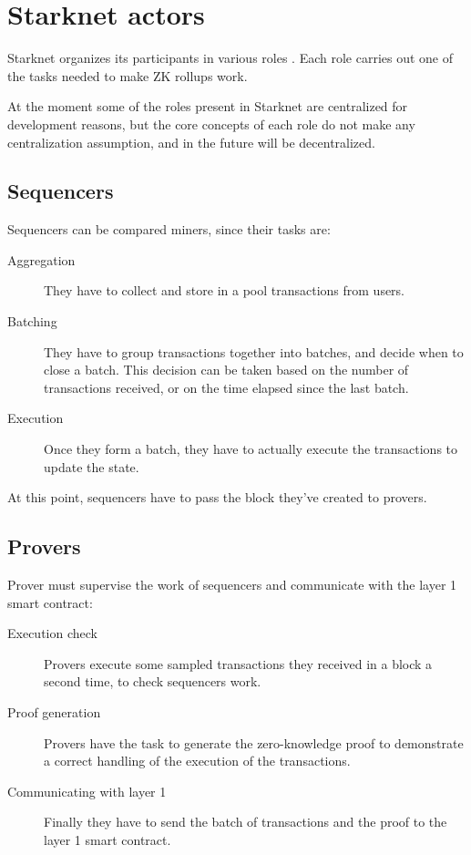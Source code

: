 \documentclass[11pt]{article}
\begin{document}
\section{Starknet actors} \label{section:starknet_actors}
Starknet organizes its participants in various roles \cite{starknet_actors}. Each role carries out one of the tasks needed to make ZK rollups work.

At the moment some of the roles present in Starknet are centralized for development reasons, but the core concepts of each role do not make any centralization assumption, and in the future will be decentralized.

\subsection{Sequencers} \label{subsection:sequencers}
Sequencers can be compared miners, since their tasks are:
\begin{description}
    \item[Aggregation] They have to collect and store in a pool transactions from users.
    \item[Batching] They have to group transactions together into batches, and decide when to close a batch. This decision can be taken based on the number of transactions received, or on the time elapsed since the last batch.
    \item[Execution] Once they form a batch, they have to actually execute the transactions to update the state.
\end{description}

At this point, sequencers have to pass the block they've created to provers.

\subsection{Provers} \label{subsection:provers}
Prover must supervise the work of sequencers and communicate with the layer 1 smart contract:
\begin{description}
    \item[Execution check] Provers execute some sampled transactions they received in a block a second time, to check sequencers work.
    \item[Proof generation] Provers have the task to generate the zero-knowledge proof to demonstrate a correct handling of the execution of the transactions.
    \item[Communicating with layer 1] Finally they have to send the batch of transactions and the proof to the layer 1 smart contract.
\end{description}
\end{document}
